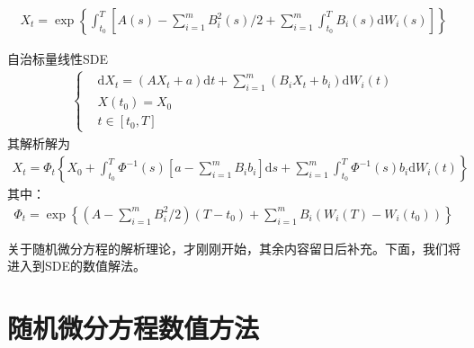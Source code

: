             \begin{align*}
                X_t = \exp\left\{\int_{t_0}^T\left[ A(s) - \sum_{i = 1}^m B_i^2(s)/2 +\sum_{i = 1}^m\int_{t_0}^TB_i(s)\mathrm{d}W_i(s)  \right]\right\}
            \end{align*}
            \par
            自治标量线性SDE
            \begin{align*}
                \left\{
                \begin{aligned}
                    &\mathrm{d}X_t = (AX_t + a)\mathrm{d}t + \sum_{i = 1}^m(B_iX_t+b_i)\mathrm{d}W_i(t)\\
                    &X(t_0) = X_0\\
                    &t\in[t_0,T]
                \end{aligned}
                 \right.
            \end{align*}
            其解析解为
            \begin{align*}
                X_t = \varPhi_t\left\{ X_0+\int_{t_0}^T\varPhi^{-1}(s)\left[a - \sum_{i = 1}^mB_ib_i\right ]\mathrm{d}s +\sum_{i =1}^m\int_{t_0}^T\varPhi^{-1}(s)b_i\mathrm{d}W_i(t)  \right\}
            \end{align*}
            其中：
            \begin{align*}
                \varPhi_t = \exp \left\{ \left ( A - \sum_{i = 1}^mB_i^2/2 \right )(T-t_0) +\sum_{i = 1}^mB_i(W_i(T) - W_i(t_0)) \right\}
            \end{align*}
            \par
            关于随机微分方程的解析理论，才刚刚开始，其余内容留日后补充。下面，我们将进入到SDE的数值解法。


\section{随机微分方程数值方法}
    \label{sec:随机微分方程数值方法}
